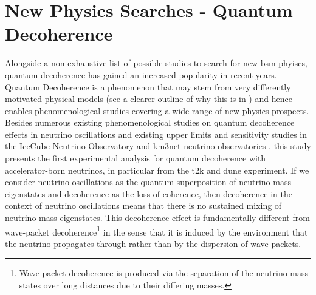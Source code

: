 \section{New Physics Searches - Quantum Decoherence}\label{subsec:decoh}
Alongside a non-exhaustive list of possible studies to search for new \acrfull{bsm} phyiscs, quantum decoherence has gained an increased popularity in recent years. Quantum Decoherence is a phenomenon that may stem from very differently motivated physical models (see a clearer outline of why this is in ) and hence enables phenomenological studies covering a wide range of new physics prospects. Besides numerous existing phenomenological studies on quantum decoherence effects in neutrino oscillations \cite{DeRomeri:2023dht,Barenboim:2024wdn,Gomes:2020muc} and existing upper limits and sensitivity studies in the IceCube Neutrino Observatory \cite{IceCube:2021tdn,ICECUBE:2023gdv} and \acrfull{km3net} neutrino observatories \cite{KM3NeT:2024jji}, this study presents the first experimental analysis for quantum decoherence with accelerator-born neutrinos, in particular from the \acrshort{t2k} and \acrshort{dune} experiment. If we consider neutrino oscillations as the quantum superposition of neutrino mass eigenstates and decoherence as the loss of coherence, then decoherence in the context of neutrino oscillations means that there is no sustained mixing of neutrino mass eigenstates. This decoherence effect is fundamentally different from wave-packet decoherence\footnote{Wave-packet decoherence is produced via the separation of the neutrino mass states over long distances due to their differing masses.} in the sense that it is induced by the environment that the neutrino propagates through rather than by the dispersion of wave packets.